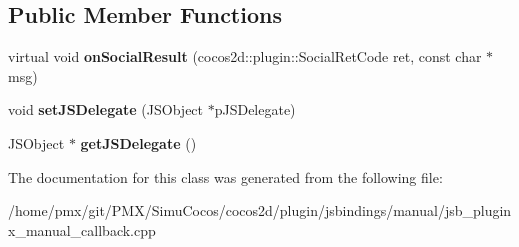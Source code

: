 \subsection*{Public Member Functions}
\begin{DoxyCompactItemize}
\item 
\mbox{\label{classPluginx__SocialResult_ab8a847549dfd0197dcd4afeff01bd816}} 
virtual void {\bfseries on\+Social\+Result} (cocos2d\+::plugin\+::\+Social\+Ret\+Code ret, const char $\ast$msg)
\item 
\mbox{\label{classPluginx__SocialResult_a9c178a5c833fa1221b885185e528d423}} 
void {\bfseries set\+J\+S\+Delegate} (J\+S\+Object $\ast$p\+J\+S\+Delegate)
\item 
\mbox{\label{classPluginx__SocialResult_a0d969d140fc2bc1b99ef094ed66739b9}} 
J\+S\+Object $\ast$ {\bfseries get\+J\+S\+Delegate} ()
\end{DoxyCompactItemize}


The documentation for this class was generated from the following file\+:\begin{DoxyCompactItemize}
\item 
/home/pmx/git/\+P\+M\+X/\+Simu\+Cocos/cocos2d/plugin/jsbindings/manual/jsb\+\_\+pluginx\+\_\+manual\+\_\+callback.\+cpp\end{DoxyCompactItemize}
